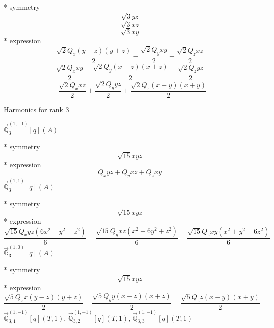 \documentclass[fleqn,8pt]{jsarticle}
\begin{document}
\noindent\quad ** symmetry
\begin{dmath*}
\sqrt{3} y z
\end{dmath*}
\begin{dmath*}
\sqrt{3} x z
\end{dmath*}
\begin{dmath*}
\sqrt{3} x y
\end{dmath*}
\noindent\quad ** expression
\begin{dmath*}
\frac{\sqrt{2} Q_{x} \left(y - z\right) \left(y + z\right)}{2} - \frac{\sqrt{2} Q_{y} x y}{2} + \frac{\sqrt{2} Q_{z} x z}{2}
\end{dmath*}
\begin{dmath*}
\frac{\sqrt{2} Q_{x} x y}{2} - \frac{\sqrt{2} Q_{y} \left(x - z\right) \left(x + z\right)}{2} - \frac{\sqrt{2} Q_{z} y z}{2}
\end{dmath*}
\begin{dmath*}
- \frac{\sqrt{2} Q_{x} x z}{2} + \frac{\sqrt{2} Q_{y} y z}{2} + \frac{\sqrt{2} Q_{z} \left(x - y\right) \left(x + y\right)}{2}
\end{dmath*}

\noindent * Harmonics for rank 3

\noindent\quad $\vec{\mathbb{Q}}_{3}^{(1,-1)}[q](A)$

\noindent\quad ** symmetry
\begin{dmath*}
\sqrt{15} x y z
\end{dmath*}
\noindent\quad ** expression
\begin{dmath*}
Q_{x} y z + Q_{y} x z + Q_{z} x y
\end{dmath*}
\noindent\quad $\vec{\mathbb{Q}}_{3}^{(1,1)}[q](A)$

\noindent\quad ** symmetry
\begin{dmath*}
\sqrt{15} x y z
\end{dmath*}
\noindent\quad ** expression
\begin{dmath*}
\frac{\sqrt{15} Q_{x} y z \left(6 x^{2} - y^{2} - z^{2}\right)}{6} - \frac{\sqrt{15} Q_{y} x z \left(x^{2} - 6 y^{2} + z^{2}\right)}{6} - \frac{\sqrt{15} Q_{z} x y \left(x^{2} + y^{2} - 6 z^{2}\right)}{6}
\end{dmath*}
\noindent\quad $\vec{\mathbb{G}}_{3}^{(1,0)}[q](A)$

\noindent\quad ** symmetry
\begin{dmath*}
\sqrt{15} x y z
\end{dmath*}
\noindent\quad ** expression
\begin{dmath*}
\frac{\sqrt{5} Q_{x} x \left(y - z\right) \left(y + z\right)}{2} - \frac{\sqrt{5} Q_{y} y \left(x - z\right) \left(x + z\right)}{2} + \frac{\sqrt{5} Q_{z} z \left(x - y\right) \left(x + y\right)}{2}
\end{dmath*}
\noindent\quad $\vec{\mathbb{Q}}_{3,1}^{(1,-1)}[q](T,1)$, $\vec{\mathbb{Q}}_{3,2}^{(1,-1)}[q](T,1)$, $\vec{\mathbb{Q}}_{3,3}^{(1,-1)}[q](T,1)$
\end{document}
